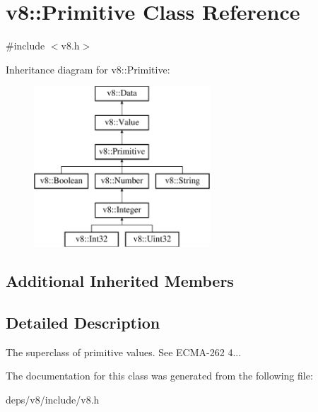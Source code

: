 \hypertarget{classv8_1_1_primitive}{}\section{v8\+:\+:Primitive Class Reference}
\label{classv8_1_1_primitive}


{\ttfamily \#include $<$v8.\+h$>$}

Inheritance diagram for v8\+:\+:Primitive\+:\begin{figure}[H]
\begin{center}
\leavevmode
\includegraphics[height=6.000000cm]{classv8_1_1_primitive}
\end{center}
\end{figure}
\subsection*{Additional Inherited Members}


\subsection{Detailed Description}
The superclass of primitive values. See E\+C\+M\+A-\/262 4... 

The documentation for this class was generated from the following file\+:\begin{DoxyCompactItemize}
\item 
deps/v8/include/v8.\+h\end{DoxyCompactItemize}
